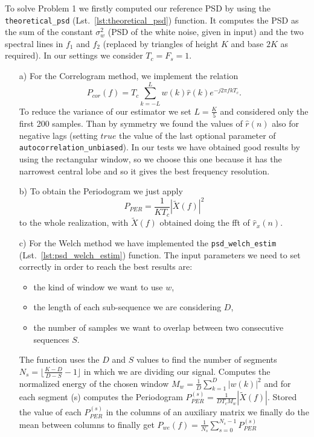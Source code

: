 \documentclass{article}
\newcommand{\inlinecode}[1]{\lstinline[basicstyle=\ttfamily,
    keywordstyle={},
    stringstyle={},
    commentstyle={\itshape}]{#1}}
\newcommand{\abs}[1]{\left|#1\right|}
\begin{document}
To solve Problem 1 we firstly computed our reference PSD by using the \inlinecode{theoretical_psd} (Lst.~\ref{lst:theoretical_psd}) function. It computes the PSD as the sum of the constant $\sigma_w^2$ (PSD of the white noise, given in input) and the two spectral lines in $f_1$ and $f_2$ (replaced by triangles of height $K$ and base $2K$ as required). In our settings we consider $T_c = F_s = 1$.
\begin{itemize}
\item[a)] For the Correlogram method, we implement the relation
  \[ P_{cor}(f) = T_c \sum_{k=-L}^{L} w(k)\hat{r}(k)e^{-j 2 \pi  f k T_c} . \]
  To reduce the variance of our estimator we set $L=\frac{K}{5}$ and considered only the first 200 samples. Than by symmetry we found the values of $\hat{r}(n)$ also for negative lags (setting $true$ the value of the last optional parameter of \inlinecode{autocorrelation_unbiased}). In our tests we have obtained good results by using the rectangular window, so we choose this one because it has the narrowest central lobe and so it gives the best frequency resolution.
 \item[b)] To obtain the Periodogram we just apply
   \[ P_{PER} = \frac{1}{K T_c} |\tilde{X}(f)|^2 \]
   to the whole realization, with $\tilde{X}(f)$ obtained doing the fft of $\hat{r}_x(n)$.
 \item[c)] For the Welch method we have implemented the \inlinecode{psd_welch_estim} (Lst.~\ref{lst:psd_welch_estim}) function. The input parameters we need to set correctly in order to reach the best results are:
 \begin{itemize}
 \item the kind of window we want to use $w$,
 \item the length of each sub-sequence we are considering $D$, 
 \item the number of samples we want to overlap between two consecutive sequences $S$. 
\end{itemize} 
The function uses the $D$ and $S$ values to find the number of segments $N_s = \bigl\lfloor \frac{K-D}{D-S} -1\bigl\rfloor $ in which we are dividing our signal. Computes the normalized energy of the chosen window $M_w = \frac{1}{D} \sum_{k=1}^{D} {\abs{w(k)}^2} $ and for each segment (s) computes the Periodogram $P_{PER}^{(s)} = \frac{1}{D T_c M_w} |\tilde{X}(f)|$. Stored the value of each $P_{PER}^{(s)}$ in the columns of an auxiliary matrix we finally do the mean between columns to finally get $P_{we}(f) = \frac{1}{N_s} \sum_{s=0}^{N_s-1} P_{PER}^{(s)} $

\end{itemize}
\end{document}
